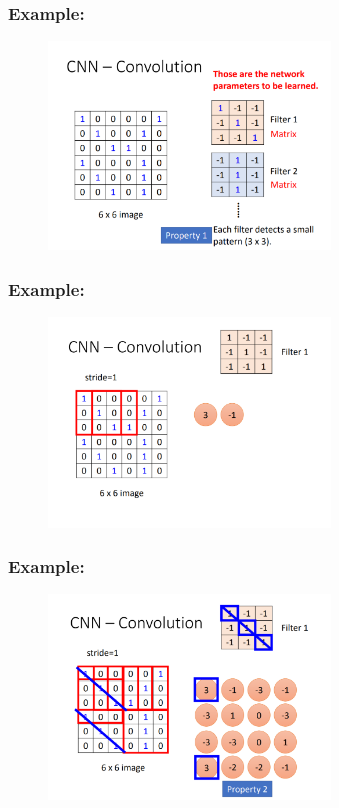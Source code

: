 \documentclass{beamer}
\begin{document}
    \begin{frame}
    \frametitle{Example: }
        \begin{figure}[H]
            \begin{center}
                \includegraphics[width=7.5cm]{ppt2}
            \end{center}
        \end{figure}
    \end{frame}
    \begin{frame}
    \frametitle{Example: }
        \begin{figure}[H]
            \begin{center}
                \includegraphics[width=7.5cm]{ppt3}
            \end{center}
        \end{figure}
    \end{frame}
    \begin{frame}
    \frametitle{Example: }
        \begin{figure}[H]
            \begin{center}
                \includegraphics[width=7.5cm]{ppt4}
            \end{center}
        \end{figure}
    \end{frame}
\end{document}
